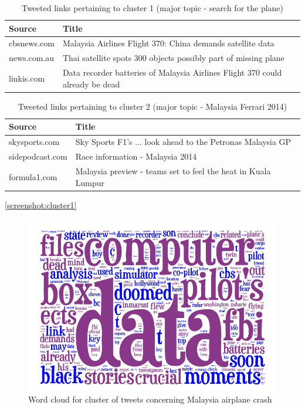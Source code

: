 \documentclass{acm_proc_10ptArticle-sp}
\begin{document}
\begin{table}[!ht]
  \centering
  \caption{Tweeted links pertaining to cluster 1 (major topic - search for the plane)}
    \label{table:linkscluster1}
    \begin{tabular}{| l | l |}
	Source & Title \\ \hline
cbsnews.com & Malaysia Airlines Flight 370: China demands satellite data\\
news.com.au & Thai satellite spots 300 objects possibly part of missing plane\\
linkis.com & Data recorder batteries of Malaysia Airlines Flight 370 could already be dead\\
  \end{tabular}
\end{table}

\begin{table}[!ht]
  \centering
  \caption{Tweeted links pertaining to cluster 2 (major topic - Malaysia Ferrari 2014)}
    \label{table:linkscluster}
    \begin{tabular}{| l | l |}
	Source & Title \\ \hline
skysports.com & Sky Sports F1's ... look ahead to the Petronas Malaysia GP \\
sidepodcast.com & Race information - Malaysia 2014\\
formula1.com & Malaysia preview - teams set to feel the heat in Kuala Lumpur\\
  \end{tabular}
\end{table}

\ref{screenshot:cluster1}
\begin{figure}[H]
  \centering
  \includegraphics[width=0.9\linewidth]{img/cluster1.png}
  \caption{Word cloud for cluster of tweets concerning Malaysia airplane crash}
  \label{screenshot:limitation}
\end{figure}
\end{document}
